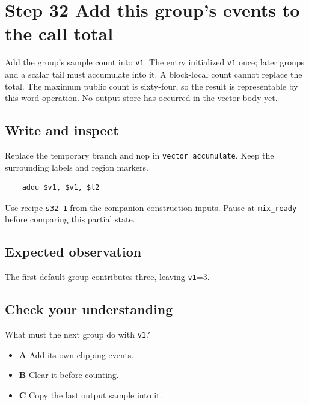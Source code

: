 \section{Step 32 Add this group’s events to the call total}\label{pcm-s32}

Add the group’s sample count into \texttt{v1}. The entry initialized \texttt{v1} once; later groups and a scalar tail must accumulate into it. A block-local count cannot replace the total. The maximum public count is sixty-four, so the result is representable by this word operation. No output store has occurred in the vector body yet.

\subsection{Write and inspect}
Replace the temporary branch and nop in \texttt{vector\_accumulate}. Keep the surrounding labels and region markers.

\begin{verbatim}
    addu $v1, $v1, $t2
\end{verbatim}
Use recipe \texttt{s32-1} from the companion construction inputs. Pause at \texttt{mix\_ready} before comparing this partial state.

\subsection{Expected observation}
The first default group contributes three, leaving \texttt{v1}=3.

\subsection{Check your understanding}
What must the next group do with \texttt{v1}?

\begin{itemize}
  \item \textbf{A} Add its own clipping events.
  \item \textbf{B} Clear it before counting.
  \item \textbf{C} Copy the last output sample into it.
\end{itemize}
